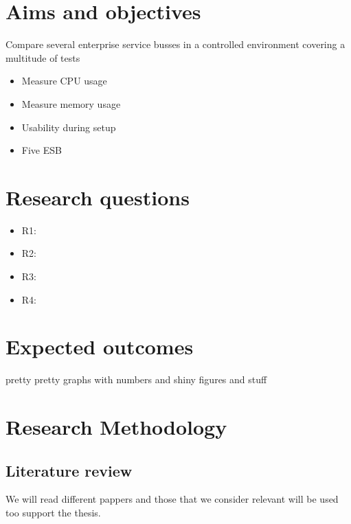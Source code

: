 \documentclass[10pt,a4paper]{proposal}
\begin{document}
\section*{Aims and objectives}
Compare several enterprise service busses in a controlled environment covering a multitude of tests 

\begin{itemize}
	\item Measure CPU usage
	\item Measure memory usage
	\item Usability during setup
	\item  Five ESB
\end{itemize}


\section*{Research questions}
\begin{itemize}
	\item R1:
	\item R2:
	\item R3:
	\item R4:
\end{itemize}


\section*{Expected outcomes}
pretty pretty graphs with numbers and shiny figures and stuff


\section*{Research Methodology}

	\subsection{Literature review}
		We will read different pappers and those that we consider relevant will be used too support the thesis.
\end{document}
